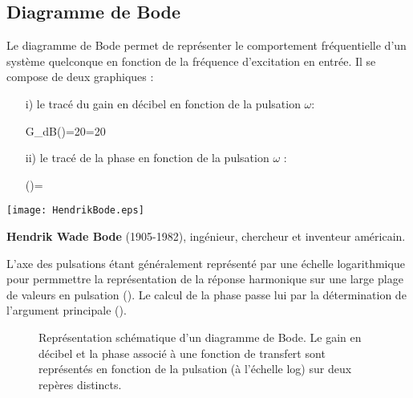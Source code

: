 \subsection{Diagramme de Bode}
Le diagramme de Bode permet de représenter le comportement fréquentielle 
d'un système quelconque en fonction de la fréquence d'excitation en entrée. 
Il se compose de deux graphiques :
\begin{itemize}
    \item[i)] le tracé du gain en décibel en fonction de la pulsation $\omega$:
        \begin{bequation} 
            G_{dB}(\omega)=20=20 
        \end{bequation}
    \item[ii)] le tracé de la phase en fonction de la pulsation $\omega$ :
        \begin{bequation} 
            \phi(\omega)=
        \end{bequation}
\end{itemize}
\begin{marginfigure}
    \centering
    \texttt{[image: HendrikBode.eps]} 
    \caption*{\textbf{Hendrik Wade Bode}
    (1905-1982), ingénieur, chercheur et inventeur américain.}
\end{marginfigure}
L'axe des pulsations étant généralement représenté par une échelle 
logarithmique pour permmettre la représentation de la réponse harmonique sur 
une large plage de valeurs en pulsation (). Le calcul de la
phase passe lui par la détermination de l'argument principale 
().
\begin{figure}[!h]
    \centering
    
    \caption{Représentation schématique d'un diagramme de Bode. Le gain en 
             décibel et la phase associé à une fonction de transfert sont 
             représentés en fonction de la pulsation (à l'échelle log) sur 
             deux repères distincts.\label{fig-sche_bode}}
\end{figure}

